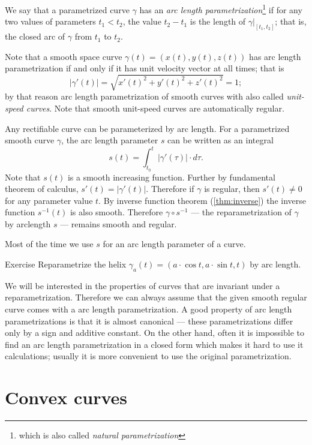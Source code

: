 We say that a parametrized curve $\gamma$ has an \emph{arc length parametrization}\footnote{which is also called \emph{natural parametrization}}
if for any two values of parameters $t_1<t_2$, the value $t_2-t_1$ is the length of $\gamma|_{[t_1,t_2]}$; that is, the closed arc of $\gamma$ from $t_1$ to $t_2$.

Note that a smooth space curve $\gamma(t)=(x(t),y(t),z(t))$ has arc length parametrization if and only if it has unit velocity vector at all times;
that is 
\[|\gamma'(t)|=\sqrt{x'(t)^2+y'(t)^2+z'(t)^2}=1;\]
by that reason arc length parametrization of smooth curves with also called \emph{unit-speed curves}.
Note that smooth unit-speed curves are automatically regular.


Any rectifiable curve can be parameterized by arc length.
For a parametrized smooth curve $\gamma$, the arc length parameter $s$ can be written as an integral
\[s(t)=\int_{t_0}^t |\gamma'(\tau)|\cdot d\tau.\]
Note that $s(t)$ is a smooth increasing function.
Further by fundamental theorem of calculus, $s'(t)=|\gamma'(t)|$.
Therefore if $\gamma$ is regular, then $s'(t)\ne0$ for any parameter value $t$.
By inverse function theorem (\ref{thm:inverse}) the inverse function $s^{-1}(t)$ is also smooth.
Therefore $\gamma\circ s^{-1}$ --- the reparametrization  of $\gamma$ by arclength  $s$ --- remains smooth and regular.

Most of the time we use $s$ for an arc length parameter of a curve.

\begin{thm}{Exercise}\label{ex:arc-length-helix}
Reparametrize the helix 
$\gamma_a(t)=(a\cdot\cos t,a\cdot \sin t,t)$
by arc length.
\end{thm}

We will be interested in the properties of curves that are invariant under a reparametrization.
Therefore we can always assume that the given smooth regular curve comes with a arc length parametrization.
A good property of arc length parametrizations is that it is almost canonical --- these parametrizations differ only by a sign and additive constant.
On the other hand, often it is impossible to find an arc length parametrization in a closed form which makes it hard to use it calculations;
usually it is more convenient to use the original parametrization.

\section*{Convex curves}

